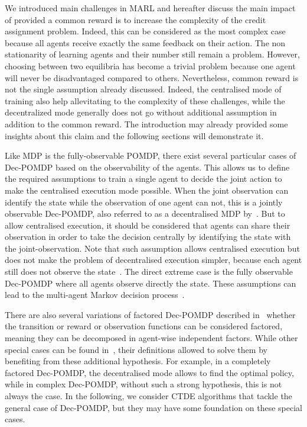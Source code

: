 We introduced main challenges in MARL and hereafter discuss the main impact of provided a common reward is to increase the complexity of the credit assignment problem.
Indeed, this can be considered as the most complex case because all agents receive exactly the same feedback on their action.
The non stationarity of learning agents and their number still remain a problem.
However, choosing between two equilibria has become a trivial problem because one agent will never be disadvantaged compared to others.
Nevertheless, common reward is not the single assumption already discussed.
Indeed, the centralised mode of training also help allevitating to the complexity of these challenges, while the decentralized mode generally does not go without additional assumption in addition to the common reward.
The introduction may already provided some insights about this claim and the following sections will demonstrate it.

Like MDP is the fully-observable POMDP, there exist several particular cases of Dec-POMDP based on the observability of the agents.
This allows us to define the required assumptions to train a single agent to decide the joint action to make the centralised execution mode possible.
When the joint observation can identify the state while the observation of one agent can not, this is a jointly observable Dec-POMDP, also referred to as a decentralised MDP by~\cite{DecPomdp}.
But to allow centralised execution, it should be considered that agents can share their observation in order to take the decision centrally by identifying the state with the joint-observation.
Note that such assumption allows centralised execution but does not make the problem of decentralised execution simpler, because each agent still does not observe the state~\citep{bernstein2002complexity}.
The direct extreme case is the fully observable Dec-POMDP where all agents observe directly the state.
These assumptions can lead to the multi-agent Markov decision process~\citep{boutilier1996planning}.

There are also several variations of factored Dec-POMDP described in~\citep{DecPomdp} whether the transition or reward or observation functions can be considered factored, meaning they can be decomposed in agent-wise independent factors.
While other special cases can be found in~\citep{DecPomdp}, their definitions allowed to solve them by benefiting from these additional hypothesis.
For example, in a completely factored Dec-POMDP, the decentralised mode allows to find the optimal policy, while in complex Dec-POMDP, without such a strong hypothesis, this is not always the case.
In the following, we consider CTDE algorithms that tackle the general case of Dec-POMDP, but they may have some foundation on these special cases.

